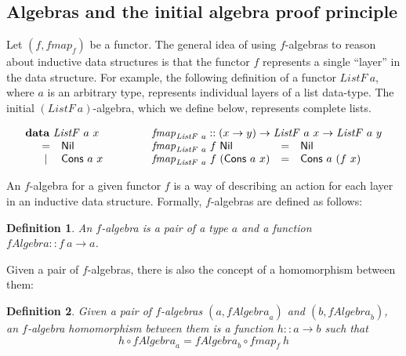 \documentclass{jfp1}
\newtheorem{definition}{Definition}
\newcommand{\kw}[1]{\textbf{#1}}
\begin{document}
\subsection{Algebras and the initial algebra proof principle}
\label{sec:f-algebras-detail}

Let $(f, \mathit{fmap}_f)$ be a functor. The general idea of using
$f$-algebras to reason about inductive data structures is that the
functor $f$ represents a single ``layer'' in the data structure. For
example, the following definition of a functor $\mathit{ListF}~a$,
where $a$ is an arbitrary type, represents individual layers of a list
data-type. The initial $(\mathit{ListF}~a)$-algebra, which we define
below, represents complete lists.

\begin{displaymath}
  \begin{array}{l@{\hspace{3em}}l}
    \begin{array}{l}
      \kw{data}~\mathit{ListF}~a~x \\
      \quad
      \begin{array}{cl}
        = & \mathsf{Nil} \\
        | & \mathsf{Cons}~a~x
      \end{array}
    \end{array}
    &
    \begin{array}{l}
      \mathit{fmap}_{\mathit{ListF}~a} :: (x \to y) \to \mathit{ListF}~a~x \to \mathit{ListF}~a~y \\
      \begin{array}{@{}l@{\hspace{0.3em}}l@{\hspace{0.3em}}lcl}
      \mathit{fmap}_{\mathit{ListF}~a}&f&\mathsf{Nil} &=& \mathsf{Nil} \\
      \mathit{fmap}_{\mathit{ListF}~a}&f&(\mathsf{Cons}~a~x) &=& \mathsf{Cons}~a~(f~x)
    \end{array}
    \end{array}
  \end{array}
\end{displaymath}

An $f$-algebra for a given functor $f$ is a way of describing an
action for each layer in an inductive data structure. Formally,
$f$-algebras are defined as follows:
\begin{definition}
  An $f$-algebra is a pair of
  a type $a$ and a function $\mathit{fAlgebra} :: f~a \to a$.
\end{definition}
Given a pair of $f$-algebras, there is also the concept of a
homomorphism between them:
\begin{definition}
  Given a pair of $f$-algebras $(a,\mathit{fAlgebra}_a)$ and $(b,
  \mathit{fAlgebra}_b)$, an $f$-algebra homomorphism between them is a
  function $h :: a \to b$ such that
  \begin{displaymath}
    h \circ \mathit{fAlgebra}_a = \mathit{fAlgebra}_b \circ \mathit{fmap}_f~h
  \end{displaymath}
\end{definition}
\end{document}
